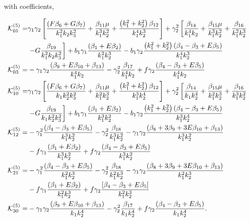 with coefficients, 

\begin{align*}
\mathcal{K}_{01}^{(5)}=& \gamma_1 \gamma_2 \left[ \frac{\left( F \beta_{6} + G \beta_{7} \right)}{k_1^2 k_2 k_3^2} + \frac{\beta_{11} \mu}{k_1^3 k_2^2} + \frac{\left( k_1^2 + k_2^2 \right) \beta_{12} }{k_1^4 k_2^3} \right] + \gamma_2^2 \left[ \frac{\beta_{14}}{k_1^4 k_2} + \frac{\beta_{15} \mu }{k_1^3 k_2^2} + \frac{\beta_{16}}{k_1^2 k_2^3} \right. \\
&\left. - G \frac{\beta_{19}}{k_1^2 k_2 k_3^2} \right] + b_1 \gamma_1 \frac{\left( \beta_1 + E \beta_2 \right)}{k_1^2 k_2^3} - b_1 \gamma_2 \frac{\left( k_1^2 + k_2^2\right) \left( {\beta_{4}-\beta_{3}} + E \beta_{5} \right)}{k_1^4 k_2^3} \\
\mathcal{K}_{03}^{(5)}=& - \gamma_1 \gamma_2 \frac{\left( \beta_{9} + E \beta_{10} + \beta_{13} \right)}{k_1^4 k_2} - \gamma_2^2 \frac{\beta_{17}}{k_1^4 k_2} + f \gamma_2 \frac{\left( {\beta_{4}-\beta_{3}} + E \beta_{5} \right)}{k_1^4 k_2 }\\
\mathcal{K}_{10}^{(5)}=&\gamma_1 \gamma_2 \left[ \frac{\left( F \beta_{6} + G \beta_{7} \right)}{k_1 k_2^2 k_3^2} + \frac{\beta_{11} \mu}{k_1^2 k_2^3} + \frac{\left( k_1^2 + k_2^2 \right) \beta_{12}}{k_1^3 k_2^4}\right] + \gamma_2^2 \left[ \frac{\beta_{14}}{k_1 k_2^4} + \frac{\beta_{15} \mu}{k_1^2 k_2^3} + \frac{\beta_{16}}{k_1^3 k_2^2} \right. \\
&\left. - G \frac{\beta_{19}}{k_1 k_2^2 k_3^2} \right] + b_1 \gamma_1 \frac{\left( \beta_1 + E \beta_2 \right)}{k_1^3 k_2^2} - b_1 \gamma_2 \frac{\left( k_1^2 + k_2^2\right) \left( {\beta_{4}-\beta_{3}} + E \beta_{5} \right)}{k_1^3 k_2^4} \\
\mathcal{K}_{12}^{(5)}=& - \gamma_1^2 \frac{\left( {\beta_{4}-\beta_{3}} + E \beta_{5} \right)}{k_1^3 k_2^2} - \gamma_2^2 \frac{\beta_{18}}{k_1^3 k_2^2} - \gamma_1 \gamma_2 \frac{\left( \beta_{8} + 3 \beta_{9} + 3 E \beta_{10} + \beta_{13} \right) }{k_1^3 k_2^2} \\
& - f \gamma_1 \frac{\left( \beta_1 + E \beta_2 \right)}{k_1^3 k_2^2} + f \gamma_2 \frac{\left( {\beta_{4}-\beta_{3}} + E \beta_{5} \right)}{k_1^3 k_2^2}\\
\mathcal{K}_{21}^{(5)}=& - \gamma_1^2 \frac{\left( {\beta_{4}-\beta_{3}} + E \beta_{5} \right)}{k_1^2 k_2^3} - \gamma_2^2 \frac{\beta_{18}}{k_1^2 k_2^3} - \gamma_1 \gamma_2 \frac{\left( \beta_{8} + 3 \beta_{9} + 3 E \beta_{10} + \beta_{13} \right)}{k_1^2 k_2^3} \\
&- f \gamma_1 \frac{\left( \beta_1 + E \beta_2 \right)}{k_1^2 k_2^3} + f \gamma_2 \frac{\left[ {\beta_{4}-\beta_{3}} + E \beta_{5} \right]}{k_1^2 k_2^3} \\
\mathcal{K}_{30}^{(5)}=& -\gamma_1 \gamma_2 \frac{\left( \beta_{9} + E \beta_{10} + \beta_{13} \right)}{k_1 k_2^4} - \gamma_2^2 \frac{\beta_{17}}{k_1 k_2^4} + f \gamma_2 \frac{\left( {\beta_{4}-\beta_{3}} + E \beta_{5} \right)}{k_1 k_2^4} .
\end{align*}

